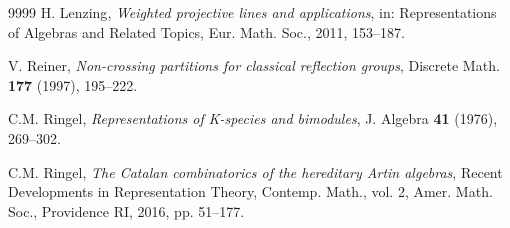 \documentclass[a4paper, 11pt, reqno]{amsart}
\numberwithin{equation}{section}
\theoremstyle{remark}
\theoremstyle{definition}
\begin{document}
\begin{thebibliography}{9999}
    {\sc H. Lenzing}, {\em Weighted projective lines and applications}, in: Representations of Algebras and Related Topics, Eur. Math. Soc., 2011, 153--187.


    {\sc V. Reiner}, {\em Non-crossing partitions for classical reflection groups}, Discrete Math. {\bf 177} (1997), 195--222.

    {\sc C.M. Ringel}, {\em Representations of {K}-species and bimodules}, J. Algebra {\bf 41} (1976), 269--302.

    {\sc C.M. Ringel}, {\em The Catalan combinatorics of the hereditary {A}rtin algebras}, Recent Developments in Representation Theory, Contemp. Math., vol. 2, Amer. Math. Soc., Providence RI, 2016, pp. 51--177.




\end{thebibliography}
\end{document}
